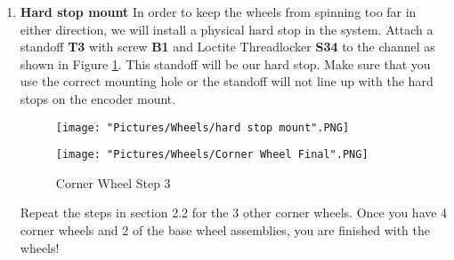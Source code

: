 \documentclass[12pt]{article}
\begin{document}
\begin{enumerate}
\item \textbf{Hard stop mount} In order to keep the wheels from spinning too far in either direction, we will install a physical hard stop in the system. Attach a standoff \textbf{T3} with screw \textbf{B1} and Loctite Threadlocker \textbf{S34} to the channel as shown in Figure \ref{corner wheel step 3}. This standoff will be our hard stop. Make sure that you use the correct mounting hole or the standoff will not line up with the hard stops on the encoder mount.

\begin{figure}[H]
  \centering
  \begin{minipage}[b]{0.45\textwidth}
    \texttt{[image: "Pictures/Wheels/hard stop mount".PNG]}
  \end{minipage}
  \hfill
  \begin{minipage}[b]{0.45\textwidth}
    \texttt{[image: "Pictures/Wheels/Corner Wheel Final".PNG]}
  \end{minipage}
  \caption{Corner Wheel Step 3}
  \label{corner wheel step 3}
\end{figure}

Repeat the steps in section 2.2 for the 3 other corner wheels.  Once you have 4 corner wheels and 2 of the base wheel assemblies, you are finished with the wheels!

\end{enumerate}
\end{document}
